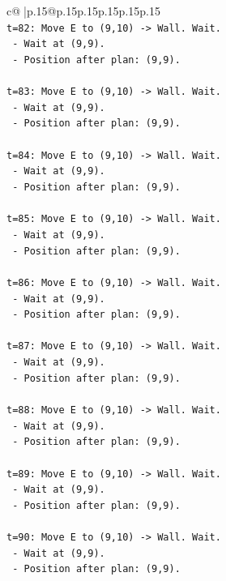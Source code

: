 \documentclass{article}
\begin{document}
{\begin{supertabular}{c@{$\;$}|p{.15\linewidth}@{}p{.15\linewidth}p{.15\linewidth}p{.15\linewidth}p{.15\linewidth}p{.15\linewidth}}
{{{\\ 
\texttt{t=82: Move E to (9,10) {-}> Wall. Wait.} \\
\texttt{   {-} Wait at (9,9).} \\
\texttt{   {-} Position after plan: (9,9).} \\
\\ 
\texttt{t=83: Move E to (9,10) {-}> Wall. Wait.} \\
\texttt{   {-} Wait at (9,9).} \\
\texttt{   {-} Position after plan: (9,9).} \\
\\ 
\texttt{t=84: Move E to (9,10) {-}> Wall. Wait.} \\
\texttt{   {-} Wait at (9,9).} \\
\texttt{   {-} Position after plan: (9,9).} \\
\\ 
\texttt{t=85: Move E to (9,10) {-}> Wall. Wait.} \\
\texttt{   {-} Wait at (9,9).} \\
\texttt{   {-} Position after plan: (9,9).} \\
\\ 
\texttt{t=86: Move E to (9,10) {-}> Wall. Wait.} \\
\texttt{   {-} Wait at (9,9).} \\
\texttt{   {-} Position after plan: (9,9).} \\
\\ 
\texttt{t=87: Move E to (9,10) {-}> Wall. Wait.} \\
\texttt{   {-} Wait at (9,9).} \\
\texttt{   {-} Position after plan: (9,9).} \\
\\ 
\texttt{t=88: Move E to (9,10) {-}> Wall. Wait.} \\
\texttt{   {-} Wait at (9,9).} \\
\texttt{   {-} Position after plan: (9,9).} \\
\\ 
\texttt{t=89: Move E to (9,10) {-}> Wall. Wait.} \\
\texttt{   {-} Wait at (9,9).} \\
\texttt{   {-} Position after plan: (9,9).} \\
\\ 
\texttt{t=90: Move E to (9,10) {-}> Wall. Wait.} \\
\texttt{   {-} Wait at (9,9).} \\
\texttt{   {-} Position after plan: (9,9).} \\
}}}
\end{supertabular}}
\end{document}
